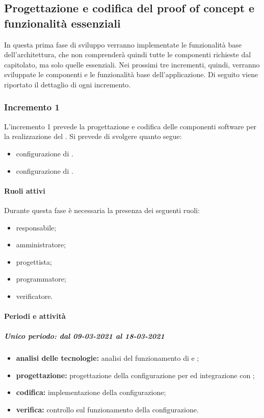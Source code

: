 \newpage %

\subsection{Progettazione e codifica del proof of concept e funzionalità essenziali}
In questa prima fase di sviluppo verranno implementate le funzionalità base dell'architettura, che non comprenderà quindi tutte le componenti richieste dal capitolato, ma solo quelle essenziali.
\newline
Nei prossimi tre incrementi, quindi, verranno sviluppate le componenti e le funzionalità base dell'applicazione. \newline
Di seguito viene riportato il dettaglio di ogni incremento.

\subsubsection{Incremento 1}
L'incremento 1 prevede la progettazione e codifica delle componenti software per la realizzazione del . Si prevede di svolgere quanto segue:
\begin{itemize}
	\item configurazione di .
	\item configurazione di .
\end{itemize}

\paragraph{Ruoli attivi}
Durante questa fase è necessaria la presenza dei seguenti ruoli: 
\begin{itemize} 
	\item responsabile; 
	\item amministratore; 
	\item progettista; 
	\item programmatore; 
	\item verificatore.
\end{itemize}

\paragraph{Periodi e attività}
\subparagraph{Unico periodo: dal 09-03-2021 al 18-03-2021}

\begin{itemize}
	\item \textbf{analisi delle tecnologie:} analisi del funzionamento di  e ;
	\item \textbf{progettazione:} progettazione della configurazione per  ed integrazione con ;
	\item \textbf{codifica:} implementazione della configurazione;
	\item \textbf{verifica:} controllo sul funzionamento della configurazione.
\end{itemize} 			

